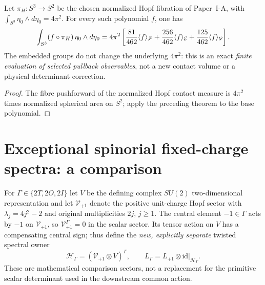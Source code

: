 \documentclass[11pt]{article}
\begin{document}
\begin{corollary}
\label{p1b:cor:new-hopf-pullback-11-cubature}
Let $\pi_H:S^3\to S^2$ be the chosen normalized Hopf fibration of
Paper~I-A, with $\int_{S^3}\eta_0\wedge d\eta_0=4\pi^2$.
For every such polynomial $f$, one has
\[
\int_{S^3}(f\circ\pi_H)\,\eta_0\wedge d\eta_0
 =4\pi^2\left[
 {81\over462}\langle f\rangle_{\mathcal F}
 +{256\over462}\langle f\rangle_{\mathcal E}
 +{125\over462}\langle f\rangle_{\mathcal V}\right].
\]
The embedded groups do not change the underlying $4\pi^2$: this is an
exact \emph{finite evaluation of selected pullback observables}, not a new
contact volume or a physical determinant correction.
\end{corollary}
\begin{proof}
The fibre pushforward of the normalized Hopf contact measure is
$4\pi^2$ times normalized spherical area on $S^2$; apply the preceding
theorem to the base polynomial.
\end{proof}

\section{Exceptional spinorial fixed-charge spectra: a comparison}
\label{p1b:sec:new-exceptional-spinorial-comparison}
For $\Gamma\in\{2T,2O,2I\}$ let $V$ be the defining complex
$SU(2)$ two-dimensional representation and let
$\mathcal V_{+1}$ denote the positive unit-charge Hopf sector with
$\lambda_j=4j^2-2$ and original multiplicities $2j$, $j\ge1$.
The central element $-1\in\Gamma$ acts by $-1$ on $\mathcal V_{+1}$,
so $\mathcal V_{+1}^\Gamma=0$ in the scalar sector.  Its tensor action
on $V$ has a compensating central sign; thus define the \emph{new,
explicitly separate} twisted spectral owner
\[
 \mathscr H_\Gamma=(\mathcal V_{+1}\otimes V)^\Gamma,
 \qquad L_\Gamma=L_{+1}\otimes\mathrm{id}\big|_{\mathscr H_\Gamma}.
\]
These are mathematical comparison sectors, not a replacement for the
primitive scalar determinant used in the downstream common action.
\end{document}
